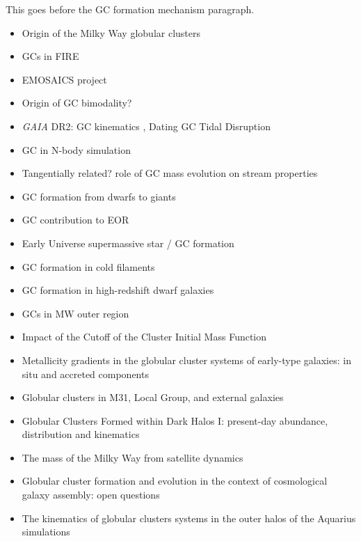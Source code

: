 \documentclass[a4paper,fleqn,usenatbib]{mnras}
\begin{document}
This goes before the GC formation mechanism paragraph.
\begin{itemize}
\item Origin of the Milky Way globular clusters \citep{2017MNRAS.465.3622R}
\item GCs in FIRE \citep{2018MNRAS.474.4232K}
\item EMOSAICS project \citep{2018MNRAS.475.4309P}
\item Origin of GC bimodality? \citep{2018MNRAS.479..200F}
\item \textit{GAIA} DR2: GC kinematics \citep{2018A&A...616A..12G}, Dating GC Tidal Disruption \citep{2018ApJ...859L..13B}
\item GC in N-body simulation \citep{2018ApJ...861...69C}
\item Tangentially related? role of GC mass evolution on stream properties \citep{2018MNRAS.474.2479B}
\item GC formation from dwarfs to giants \citep{2018MNRAS.480.2343C}
\item GC contribution to EOR \citep{2018MNRAS.479..332B}
\item Early Universe supermassive star / GC formation \citep{2018MNRAS.478.2461G}
\item GC formation in cold filaments \citep{2018ApJ...861..148M}
\item GC formation in high-redshift dwarf galaxies \citep{2018MNRAS.477..480Z}
\item GCs in MW outer region \citep{2017arXiv170804542P}
\item Impact of the Cutoff of the Cluster Initial Mass Function \citep{2018arXiv181001888C}
\item Metallicity gradients in the globular cluster systems of early-type galaxies: in situ and accreted components \citep{2018MNRAS.479.4760F}
\item Globular clusters in M31, Local Group, and external galaxies \citep{2016IAUS..317..120L}
\item Globular Clusters Formed within Dark Halos I: present-day abundance, distribution and kinematics \citep{2019MNRAS.482..219C}
\item The mass of the Milky Way from satellite dynamics \citep{2018arXiv180810456C}
\item Globular cluster formation and evolution in the context of cosmological galaxy assembly: open questions \citep{2018RSPSA.47470616F}
\item The kinematics of globular clusters systems in the outer halos of the Aquarius simulations \citep{2016A&A...592A..55V}

\end{itemize}
\end{document}
